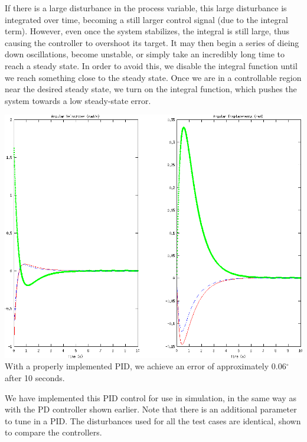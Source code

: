 \documentclass{article}
\begin{document}
If there is a large disturbance in the process variable, this large disturbance is integrated over time, becoming a still
larger control signal (due to the integral term). However, even once the system stabilizes, the integral is still large, thus
causing the controller to overshoot its target. It may then begin a series of dieing down
oscillations, become unstable, or simply take an incredibly long time to reach a steady state. In order to avoid this, we disable the integral function until we reach
something close to the steady state. Once we are in a controllable region near the desired steady
state, we turn on the integral function, which pushes the system towards a low steady-state error.
\begin{center}
    \includegraphics[scale=0.9]{images/pid_controller.png} \\
    {
        With a properly implemented PID, we achieve an error of approximately 0.06$^\circ$ after 10 seconds.
    }
\end{center}
We have implemented this PID control for use in simulation, in the same way as with the PD
controller shown earlier. Note that there is an additional parameter to tune in a PID. The
disturbances used for all the test cases are identical, shown to compare the controllers.
\end{document}
